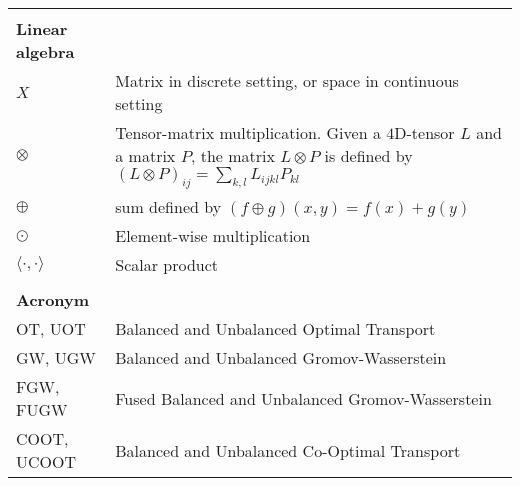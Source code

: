\begin{table}[h]
\begin{tabular}{l l}
    & \\

    \textbf{Linear algebra} & \\
    $X$ & Matrix in discrete setting, or space in continuous setting \\
    $\otimes$ & \makecell[l]{Tensor-matrix multiplication. Given a $4$D-tensor $L$ and a matrix $P$, \\
    the matrix $L \otimes P$ is defined by $(L \otimes P)_{ij} = \sum_{k,l} L_{ijkl} P_{kl}$} \\
    $\oplus$ & sum defined by $(f \oplus g)(x, y) = f(x) + g(y)$ \\
    $\odot$ & Element-wise multiplication \\
    $\langle \cdot, \cdot \rangle$ & Scalar product \\

    & \\

    \textbf{Acronym} & \\
    OT, UOT & Balanced and Unbalanced Optimal Transport \\
    GW, UGW & Balanced and Unbalanced Gromov-Wasserstein \\
    FGW, FUGW & Fused Balanced and Unbalanced Gromov-Wasserstein \\
    COOT, UCOOT & Balanced and Unbalanced Co-Optimal Transport
\end{tabular}
\end{table}